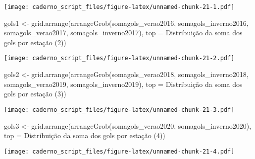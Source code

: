\documentclass[
]{article}
\newenvironment{Shaded}{\begin{snugshade}}{\end{snugshade}}
\newcommand{\AttributeTok}[1]{\textcolor[rgb]{0.77,0.63,0.00}{#1}}
\newcommand{\FunctionTok}[1]{\textcolor[rgb]{0.00,0.00,0.00}{#1}}
\newcommand{\NormalTok}[1]{#1}
\newcommand{\OtherTok}[1]{\textcolor[rgb]{0.56,0.35,0.01}{#1}}
\newcommand{\StringTok}[1]{\textcolor[rgb]{0.31,0.60,0.02}{#1}}
\begin{document}
\texttt{[image: caderno\_script\_files/figure-latex/unnamed-chunk-21-1.pdf]}

\begin{Shaded}
\begin{Highlighting}[]
\NormalTok{gols1 }\OtherTok{\textless{}{-}} \FunctionTok{grid.arrange}\NormalTok{(}\FunctionTok{arrangeGrob}\NormalTok{(somagols\_verao2016, somagols\_inverno2016,}
\NormalTok{                         somagols\_verao2017, somagols\_inverno2017), }
                         \AttributeTok{top =} \StringTok{\textquotesingle{}Distribuição da soma dos gols por estação (2)\textquotesingle{}}\NormalTok{)}
\end{Highlighting}
\end{Shaded}

\texttt{[image: caderno\_script\_files/figure-latex/unnamed-chunk-21-2.pdf]}

\begin{Shaded}
\begin{Highlighting}[]
\NormalTok{gols2 }\OtherTok{\textless{}{-}} \FunctionTok{grid.arrange}\NormalTok{(}\FunctionTok{arrangeGrob}\NormalTok{(somagols\_verao2018, somagols\_inverno2018,}
\NormalTok{                         somagols\_verao2019, somagols\_inverno2019), }
                         \AttributeTok{top =} \StringTok{\textquotesingle{}Distribuição da soma dos gols por estação (3)\textquotesingle{}}\NormalTok{)}
\end{Highlighting}
\end{Shaded}

\texttt{[image: caderno\_script\_files/figure-latex/unnamed-chunk-21-3.pdf]}

\begin{Shaded}
\begin{Highlighting}[]
\NormalTok{gols3 }\OtherTok{\textless{}{-}} \FunctionTok{grid.arrange}\NormalTok{(}\FunctionTok{arrangeGrob}\NormalTok{(somagols\_verao2020, somagols\_inverno2020), }
                         \AttributeTok{top =} \StringTok{\textquotesingle{}Distribuição da soma dos gols por estação (4)\textquotesingle{}}\NormalTok{)}
\end{Highlighting}
\end{Shaded}

\texttt{[image: caderno\_script\_files/figure-latex/unnamed-chunk-21-4.pdf]}
\end{document}
